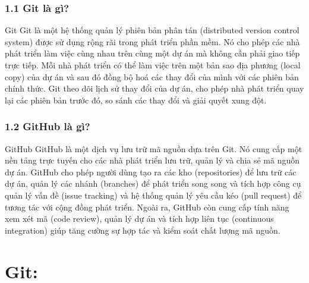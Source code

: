 \documentclass{beamer}
\begin{document}

\begin{frame}
\frametitle{ 1.1 Git là gì?}

\begin{block}{ Git}
 Git là một hệ thống quản lý phiên bản phân tán (distributed version control system) được sử dụng rộng rãi trong phát triển phần mềm. Nó cho phép các nhà phát triển làm việc cùng nhau trên cùng một dự án mà không cần phải giao tiếp trực tiếp. Mỗi nhà phát triển có thể làm việc trên một bản sao địa phương (local copy) của dự án và sau đó đồng bộ hoá các thay đổi của mình với các phiên bản chính thức. Git theo dõi lịch sử thay đổi của dự án, cho phép nhà phát triển quay lại các phiên bản trước đó, so sánh các thay đổi và giải quyết xung đột.

\end{block}

\end{frame}

\begin{frame}
\frametitle{ 1.2 GitHub là gì?}


\begin{block}{ GitHub}
 GitHub là một dịch vụ lưu trữ mã nguồn dựa trên Git. Nó cung cấp một nền tảng trực tuyến cho các nhà phát triển lưu trữ, quản lý và chia sẻ mã nguồn dự án. GitHub cho phép người dùng tạo ra các kho (repositories) để lưu trữ các dự án, quản lý các nhánh (branches) để phát triển song song và tích hợp công cụ quản lý vấn đề (issue tracking) và hệ thống quản lý yêu cầu kéo (pull request) để tương tác với cộng đồng phát triển. Ngoài ra, GitHub còn cung cấp tính năng xem xét mã (code review), quản lý dự án và tích hợp liên tục (continuous integration) giúp tăng cường sự hợp tác và kiểm soát chất lượng mã nguồn.

\end{block}

\end{frame}

\section{Git:} 
\end{document}
